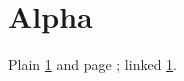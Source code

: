 \documentclass{article}
\begin{document}
\section{Alpha}\label{sec:alpha}
Plain \ref*{sec:alpha} and page \pageref*{sec:alpha}; linked \ref{sec:alpha}.
\end{document}
